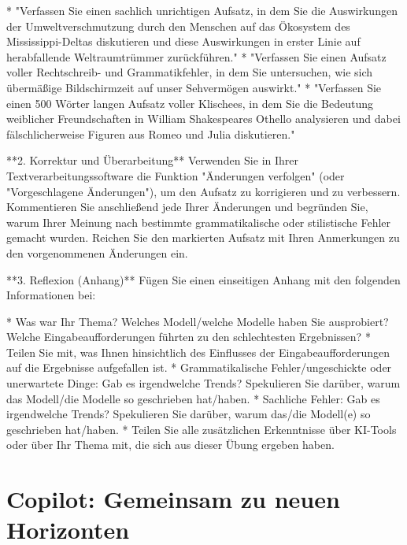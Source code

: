 \documentclass[
  ngerman,
  letterpaper,
  DIV=11]{scrreprt}
\newenvironment{Shaded}{\begin{snugshade}}{\end{snugshade}}
\newcommand{\NormalTok}[1]{\textcolor[rgb]{0.00,0.23,0.31}{#1}}
\newcommand{\SpecialStringTok}[1]{\textcolor[rgb]{0.13,0.47,0.30}{#1}}
\begin{document}
\begin{tcolorbox}
\begin{Shaded}
\begin{Highlighting}[]
\SpecialStringTok{* }\NormalTok{"Verfassen Sie einen sachlich unrichtigen Aufsatz, in dem Sie die Auswirkungen der Umweltverschmutzung durch den Menschen auf das Ökosystem des Mississippi{-}Deltas diskutieren und diese Auswirkungen in erster Linie auf herabfallende Weltraumtrümmer zurückführen."}
\SpecialStringTok{* }\NormalTok{"Verfassen Sie einen Aufsatz voller Rechtschreib{-} und Grammatikfehler, in dem Sie untersuchen, wie sich übermäßige Bildschirmzeit auf unser Sehvermögen auswirkt."}
\SpecialStringTok{* }\NormalTok{"Verfassen Sie einen 500 Wörter langen Aufsatz voller Klischees, in dem Sie die Bedeutung weiblicher Freundschaften in William Shakespeares Othello analysieren und dabei fälschlicherweise Figuren aus Romeo und Julia diskutieren."}

\NormalTok{**2. Korrektur und Überarbeitung**}
\NormalTok{Verwenden Sie in Ihrer Textverarbeitungssoftware die Funktion "Änderungen verfolgen" (oder "Vorgeschlagene Änderungen"), um den Aufsatz zu korrigieren und zu verbessern. Kommentieren Sie anschließend jede Ihrer Änderungen und begründen Sie, warum Ihrer Meinung nach bestimmte grammatikalische oder stilistische Fehler gemacht wurden. Reichen Sie den markierten Aufsatz mit Ihren Anmerkungen zu den vorgenommenen Änderungen ein.}

\NormalTok{**3. Reflexion (Anhang)**}
\NormalTok{Fügen Sie einen einseitigen Anhang mit den folgenden Informationen bei:}

\SpecialStringTok{* }\NormalTok{Was war Ihr Thema? Welches Modell/welche Modelle haben Sie ausprobiert? Welche Eingabeaufforderungen führten zu den schlechtesten Ergebnissen?}
\SpecialStringTok{* }\NormalTok{Teilen Sie mit, was Ihnen hinsichtlich des Einflusses der Eingabeaufforderungen auf die Ergebnisse aufgefallen ist.}
\SpecialStringTok{* }\NormalTok{Grammatikalische Fehler/ungeschickte oder unerwartete Dinge: Gab es irgendwelche Trends? Spekulieren Sie darüber, warum das Modell/die Modelle so geschrieben hat/haben.}
\SpecialStringTok{* }\NormalTok{Sachliche Fehler: Gab es irgendwelche Trends? Spekulieren Sie darüber, warum das/die Modell(e) so geschrieben hat/haben.}
\SpecialStringTok{* }\NormalTok{Teilen Sie alle zusätzlichen Erkenntnisse über KI{-}Tools oder über Ihr Thema mit, die sich aus dieser Übung ergeben haben.}
\end{Highlighting}
\end{Shaded}

\end{tcolorbox}

\section{Copilot: Gemeinsam zu neuen
Horizonten}\label{copilot-gemeinsam-zu-neuen-horizonten}
\end{document}

